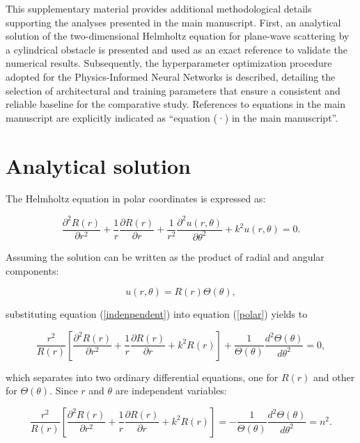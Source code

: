 \documentclass[11pt,twoside]{article}
\begin{document}
 
This supplementary material provides additional methodological details supporting the analyses presented in the main manuscript. First, an analytical solution of the two-dimensional Helmholtz equation for plane-wave scattering by a cylindrical obstacle is presented and used as an exact reference to validate the numerical results. Subsequently, the hyperparameter optimization procedure adopted for the Physics-Informed Neural Networks is described, detailing the selection of architectural and training parameters that ensure a consistent and reliable baseline for the comparative study. References to equations in the main manuscript are explicitly indicated as “equation (·) in the main manuscript”.

\section{Analytical solution}\label{sec:analytical}

The Helmholtz equation in polar coordinates is expressed as: 

\begin{equation}\label{polar}
 \frac{\partial^2 R(r)}{\partial r^2} + \frac{1}{r} \frac{\partial R(r)}{\partial r}  + \frac{1}{r^2} \frac{\partial^2 u(r, \theta)}{\partial \theta^2} + k^2 u(r, \theta) = 0 .
\end{equation}

 Assuming the solution can be written as the product of radial and angular components:

\begin{equation}\label{indenpendent}
u(r, \theta) = R(r) \Theta(\theta) ,
\end{equation}

\noindent substituting equation (\ref{indenpendent}) into equation (\ref{polar}) yields to

\begin{equation*} 
\frac{r^2}{R(r)}\left[  \frac{\partial^2 R(r)}{\partial r^2} + \frac{1}{r} \frac{\partial R(r)}{\partial r}  + k^2R(r)  \right] + \frac{1}{\Theta(\theta)} \frac{d^2\Theta(\theta)}{d\theta^2}  = 0 , 
\end{equation*}

\noindent which separates into two ordinary differential equations, one for \( R(r) \) and other for \( \Theta(\theta) \). Since \( r \) and \( \theta \) are independent variables:

\begin{equation}\label{variables-separadas}
\frac{r^2}{R(r)}\left[  \frac{\partial^2 R(r)}{\partial r^2} + \frac{1}{r} \frac{\partial R(r)}{\partial r} + k^2R(r)  \right]  = 
- \frac{1}{\Theta(\theta)} \frac{d^2\Theta(\theta)}{d\theta^2} = n^2 . 
\end{equation}
\end{document}
